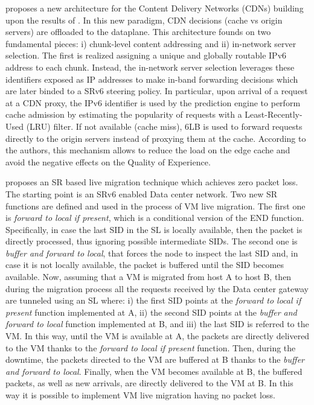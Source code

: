 \cite{desmouceauxcontent} proposes a new architecture for the Content Delivery Networks (CDNs) building upon the results of \cite{srlb}. In this new paradigm, CDN decisions (cache vs origin servers) are offloaded to the dataplane. This architecture founds on two fundamental pieces: i) chunk-level content addressing and ii) in-network server selection. The first is realized assigning a unique and globally routable IPv6 address to each chunk. Instead, the in-network server selection leverages these identifiers exposed as IP addresses to make in-band forwarding decisions which are later binded to a SRv6 steering policy. In particular, upon arrival of a request at a CDN proxy, the IPv6 identifier is used by the prediction engine to perform cache admission by estimating the popularity of requests with a Least-Recently-Used (LRU) filter. If not available (cache miss), 6LB \cite{srlb} is used to forward requests directly to the origin servers instead of proxying them at the cache. According to the authors, this mechanism allows to reduce the load on the edge cache and avoid the negative effects on the Quality of Experience.

\cite{desmouceauxzero} proposes an SR based live migration technique which achieves zero packet loss.
The starting point is an SRv6 enabled Data center network.
Two new SR functions are defined and used in the process of VM live migration.
The first one is \emph{forward to local if present}, which is a conditional version of the END function. Specifically, in case the last SID in the SL is locally available, then the packet is directly processed, thus ignoring possible intermediate SIDs.
The second one is \emph{buffer and forward to local}, that forces the node to inspect the last SID and, in case it is not locally available, the packet is buffered until the SID becomes available.
Now, assuming that a VM is migrated from host A to host B, then during the migration process all the requests received by the Data center gateway are tunneled using an SL where: i) the first SID points at the \emph{forward to local if present} function implemented at A, ii) the second SID points at the \emph{buffer and forward to local} function implemented at B, and iii) the last SID is referred to the VM.
In this way, until the VM is available at A, the packets are directly delivered to the VM thanks to the \emph{forward to local if present} function. Then, during the downtime, the packets directed to the VM are buffered at B thanks to the \emph{buffer and forward to local}. Finally, when the VM becomes available at B, the buffered packets, as well as new arrivals, are directly delivered to the VM at B.
In this way it is possible to implement VM live migration having no packet loss.

